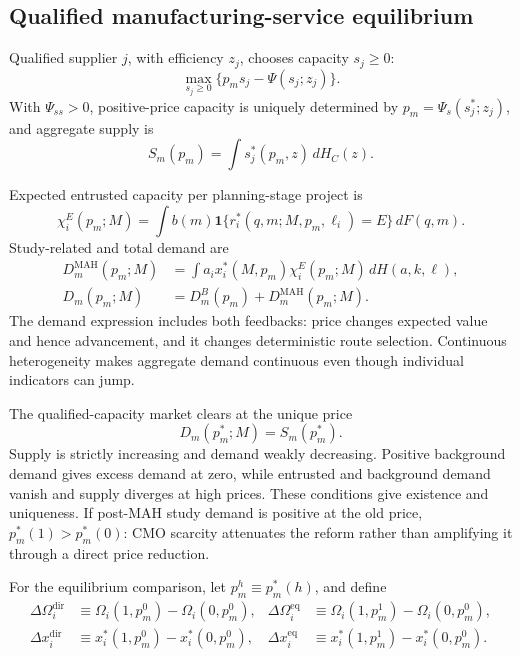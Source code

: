 \documentclass[12pt]{article}
\newcommand{\1}{\mathbf{1}}
\begin{document}
\subsection{Qualified manufacturing-service equilibrium}
\label{subsec:p16m-cmo}

Qualified supplier \(j\), with efficiency \(z_j\), chooses capacity
\(s_j\geq0\):
\begin{equation}
  \max_{s_j\geq0}\{p_ms_j-\Psi(s_j;z_j)\}.
  \label{eq:p16m-supplier}
\end{equation}
With \(\Psi_{ss}>0\), positive-price capacity is uniquely determined by
\(p_m=\Psi_s(s_j^*;z_j)\), and aggregate supply is
\[
  S_m(p_m)=\int s_j^*(p_m,z)\,dH_C(z).
\]

Expected entrusted capacity per planning-stage project is
\begin{equation}
  \chi_i^E(p_m;M)
  =
  \int b(m)\mathbf 1\{r_i^*(q,m;M,p_m,\ell_i)=E\}\,dF(q,m).
  \label{eq:p16m-project-demand}
\end{equation}
Study-related and total demand are
\begin{equation}
  \begin{aligned}
  D_m^{\mathrm{MAH}}(p_m;M)
  &=
  \int a_ix_i^*(M,p_m)\chi_i^E(p_m;M)\,dH(a,k,\ell),\\
  D_m(p_m;M)
  &=D_m^B(p_m)+D_m^{\mathrm{MAH}}(p_m;M).
  \end{aligned}
  \label{eq:p16m-demand}
\end{equation}
The demand expression includes both feedbacks: price changes expected value
and hence advancement, and it changes deterministic route selection.
Continuous heterogeneity makes aggregate demand continuous even though
individual indicators can jump.

The qualified-capacity market clears at the unique price
\begin{equation}
  D_m(p_m^*;M)=S_m(p_m^*).
  \label{eq:p16m-clearing}
\end{equation}
Supply is strictly increasing and demand weakly decreasing. Positive
background demand gives excess demand at zero, while entrusted and
background demand vanish and supply diverges at high prices. These conditions
give existence and uniqueness. If post-MAH study demand is positive at the
old price, \(p_m^*(1)>p_m^*(0)\): CMO scarcity attenuates the reform rather
than amplifying it through a direct price reduction.

For the equilibrium comparison, let \(p_m^h\equiv p_m^*(h)\), and define
\begin{align}
  \Delta\Omega_i^{\mathrm{dir}}
  &\equiv \Omega_i(1,p_m^0)-\Omega_i(0,p_m^0),
  &
  \Delta\Omega_i^{\mathrm{eq}}
  &\equiv \Omega_i(1,p_m^1)-\Omega_i(0,p_m^0),
  \label{eq:p16m-value-comparisons}\\
  \Delta x_i^{\mathrm{dir}}
  &\equiv x_i^*(1,p_m^0)-x_i^*(0,p_m^0),
  &
  \Delta x_i^{\mathrm{eq}}
  &\equiv x_i^*(1,p_m^1)-x_i^*(0,p_m^0).
  \label{eq:p16m-advancement-comparisons}
\end{align}
\end{document}
